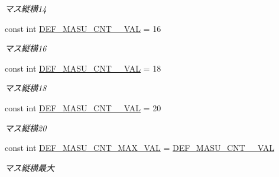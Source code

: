 \begin{DoxyCompactItemize}
\begin{DoxyCompactList}\small\item\em マス縦横14 \end{DoxyCompactList}\item 
\mbox{\label{class_reversi_form_1_1_reversi_const_ab06ffa7f1dedb1f6dd87302dae0e265d}} 
const int \hyperlink{class_reversi_form_1_1_reversi_const_ab06ffa7f1dedb1f6dd87302dae0e265d}{D\+E\+F\+\_\+\+M\+A\+S\+U\+\_\+\+C\+N\+T\+\_\+\_\+\+V\+AL} = 16
\begin{DoxyCompactList}\small\item\em マス縦横16 \end{DoxyCompactList}\item 
\mbox{\label{class_reversi_form_1_1_reversi_const_aa0c6e7f3eea4e8be6e23ce92adeae69b}} 
const int \hyperlink{class_reversi_form_1_1_reversi_const_aa0c6e7f3eea4e8be6e23ce92adeae69b}{D\+E\+F\+\_\+\+M\+A\+S\+U\+\_\+\+C\+N\+T\+\_\+\_\+\+V\+AL} = 18
\begin{DoxyCompactList}\small\item\em マス縦横18 \end{DoxyCompactList}\item 
\mbox{\label{class_reversi_form_1_1_reversi_const_a3c73cd589a734b43c9948d6a18140cc9}} 
const int \hyperlink{class_reversi_form_1_1_reversi_const_a3c73cd589a734b43c9948d6a18140cc9}{D\+E\+F\+\_\+\+M\+A\+S\+U\+\_\+\+C\+N\+T\+\_\+\_\+\+V\+AL} = 20
\begin{DoxyCompactList}\small\item\em マス縦横20 \end{DoxyCompactList}\item 
\mbox{\label{class_reversi_form_1_1_reversi_const_a29703c47577bfa8f0235f1695d6fd3c3}} 
const int \hyperlink{class_reversi_form_1_1_reversi_const_a29703c47577bfa8f0235f1695d6fd3c3}{D\+E\+F\+\_\+\+M\+A\+S\+U\+\_\+\+C\+N\+T\+\_\+\+M\+A\+X\+\_\+\+V\+AL} = \hyperlink{class_reversi_form_1_1_reversi_const_a3c73cd589a734b43c9948d6a18140cc9}{D\+E\+F\+\_\+\+M\+A\+S\+U\+\_\+\+C\+N\+T\+\_\+\_\+\+V\+AL}
\begin{DoxyCompactList}\small\item\em マス縦横最大 \end{DoxyCompactList}\item 

\end{DoxyCompactItemize}
